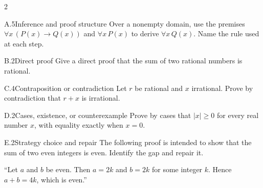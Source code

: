 \documentclass[9pt]{extarticle}
\begin{document}
\begin{multicols}{2}
\begin{CoreProblem}{A.5}{Inference and proof structure}
Over a nonempty domain, use the premises
$\forall x\,(P(x)\to Q(x))$ and $\forall x\,P(x)$ to derive
$\forall x\,Q(x)$. Name the rule used at each step.
\end{CoreProblem}
\begin{CoreProblem}{B.2}{Direct proof}
Give a direct proof that the sum of two rational numbers is rational.
\end{CoreProblem}
\begin{CoreProblem}{C.4}{Contraposition or contradiction}
Let $r$ be rational and $x$ irrational. Prove by contradiction that $r+x$ is irrational.
\end{CoreProblem}
\columnbreak
\begin{CoreProblem}{D.2}{Cases, existence, or counterexample}
Prove by cases that $|x|\ge 0$ for every real number $x$, with equality exactly when $x=0$.
\end{CoreProblem}
\begin{CoreProblem}{E.2}{Strategy choice and repair}
The following proof is intended to show that the sum of two even integers is even. Identify the gap and repair it.

``Let $a$ and $b$ be even. Then $a=2k$ and $b=2k$ for some integer $k$. Hence $a+b=4k$, which is even.''
\end{CoreProblem}
\end{multicols}
\CoreWorkArea
\FormBreak
{}
\end{document}

